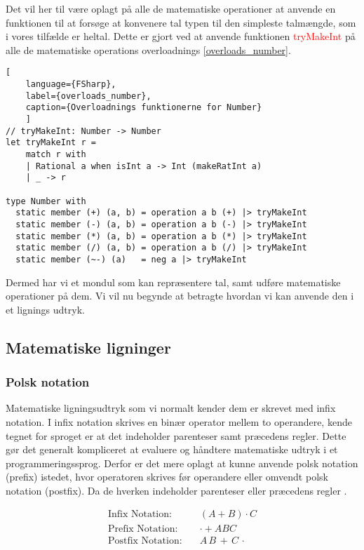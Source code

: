 \documentclass{article}
\begin{document}
Det vil her til være oplagt på alle de matematiske operationer at anvende en funktionen til at forsøge at konvenere tal typen til den simpleste talmængde, som i vores tilfælde er heltal. Dette er gjort ved at anvende funktionen \textcolor{red}{tryMakeInt} på alle de matematiske operations overloadnings \ref{overloads_number}.

\begin{lstlisting}[
    language={FSharp},
    label={overloads_number}, 
    caption={Overloadnings funktionerne for Number}
    ]
// tryMakeInt: Number -> Number
let tryMakeInt r =
    match r with
    | Rational a when isInt a -> Int (makeRatInt a)
    | _ -> r
    
type Number with
  static member (+) (a, b) = operation a b (+) |> tryMakeInt
  static member (-) (a, b) = operation a b (-) |> tryMakeInt
  static member (*) (a, b) = operation a b (*) |> tryMakeInt
  static member (/) (a, b) = operation a b (/) |> tryMakeInt
  static member (~-) (a)   = neg a |> tryMakeInt
\end{lstlisting}

Dermed har vi et mondul som kan repræsentere tal, samt udføre matematiske operationer på dem. Vi vil nu begynde at betragte hvordan vi kan anvende den i et lignings udtryk.

\subsection{Matematiske ligninger}
\subsubsection{Polsk notation}
Matematiske ligningsudtryk som vi normalt kender dem er skrevet med infix notation. I infix notation skrives en binær operator mellem to operandere, kende tegnet for sproget er at det indeholder parenteser samt præcedens regler. Dette gør det generalt kompliceret at evaluere og håndtere matematiske udtryk i et programmeringssprog. Derfor er det mere oplagt at kunne anvende polsk notation (prefix) istedet, hvor operatoren skrives før operandere eller omvendt polsk notation (postfix). Da de hverken indeholder parenteser eller præcedens regler . 

\begin{align*}
    \text{Infix Notation:} \quad & (A + B) \cdot C \\
    \text{Prefix Notation:} \quad &  \cdot + A B C  \\
    \text{Postfix Notation:} \quad & A \, B \, + \, C \, \cdot
\end{align*}
\end{document}
